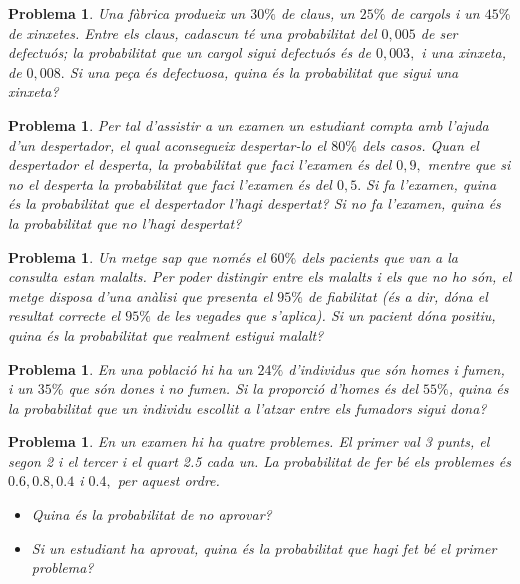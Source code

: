 \documentclass[11pt]{article}
\newcounter{prbcont}
\newtheorem{problema}[prbcont]{Problema}
\begin{document}
\begin{problema}
Una f\`abrica produeix un $30\%$ de claus, un $25\%$ de cargols i un $45\%$ de xinxetes. Entre
els claus, cadascun t\'e una probabilitat del $0,005$ de ser defectu\'os; la probabilitat que un cargol sigui defectu\'os \'es de $0,003,$ i una xinxeta, de $0,008.$ Si una pe\c{c}a \'es defectuosa, quina
\'es la probabilitat que sigui una xinxeta?
\end{problema}

\begin{problema}
Per tal d'assistir a un examen un estudiant compta amb l'ajuda d'un despertador, el
qual aconsegueix despertar-lo el $80\%$ dels casos. Quan el despertador el desperta, la
probabilitat que faci l'examen \'es del $0,9,$ mentre que si no el desperta la probabilitat que
faci l'examen \'es del $0,5.$ Si fa l'examen, quina \'es la probabilitat que el despertador l'hagi
despertat? Si no fa l'examen, quina \'es la probabilitat que no l'hagi despertat?
\end{problema}

\begin{problema}
Un metge sap que nom\'es el $60\%$ dels pacients que van a la consulta estan malalts. Per
poder distingir entre els malalts i els que no ho s\'on, el metge disposa d'una an\`alisi que
presenta el $95\%$ de fiabilitat (\'es a dir, d\'ona el resultat correcte el $95\%$ de les vegades que
s'aplica). Si un pacient d\'ona positiu, quina \'es la probabilitat que realment estigui malalt?
\end{problema}

\begin{problema}
En una poblaci\'o hi ha un $24\%$ d'individus que s\'on homes i fumen, i un $35\%$ que s\'on dones
i no fumen. Si la proporci\'o d'homes \'es del $55\%$, quina \'es la probabilitat que un individu
escollit a l'atzar entre els fumadors sigui dona?
\end{problema}

\begin{problema}
En un examen hi ha quatre problemes. El primer val 3 punts, el segon 2 i el tercer i el
quart 2.5 cada un. La probabilitat de fer b\'e els problemes \'es $0.6, 0.8, 0.4$ i $0.4,$ per aquest
ordre.
\begin{itemize}
\item [(a)] Quina \'es la probabilitat de no aprovar?
\item [(b)] Si un estudiant ha aprovat, quina \'es la probabilitat que hagi fet b\'e el primer problema?
\end{itemize}
\end{problema}
\end{document}
